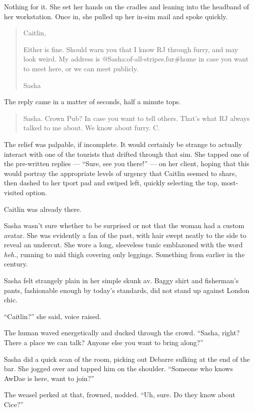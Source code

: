 Nothing for it. She set her hands on the cradles and leaning into the headband of her workstation. Once in, she pulled up her in-sim mail and spoke quickly.

\begin{quote}
Caitlin,

Either is fine. Should warn you that I know RJ through furry, and may look weird. My address is @Sasha:of-all-stripes.fur\#home in case you want to meet here, or we can meet publicly.

Sasha
\end{quote}

The reply came in a matter of seconds, half a minute tops.

\begin{quote}
Sasha. Crown Pub? In case you want to tell others. That's what RJ always talked to me about. We know about furry. C.
\end{quote}

The relief was palpable, if incomplete. It would certainly be strange to actually interact with one of the tourists that drifted through that sim. She tapped one of the pre-written replies — ``Sure, see you there!'' — on her client, hoping that this would portray the appropriate levels of urgency that Caitlin seemed to share, then dashed to her tport pad and swiped left, quickly selecting the top, most-visited option.

Caitlin was already there.

Sasha wasn't sure whether to be surprised or not that the woman had a custom avatar. She was evidently a fan of the past, with hair swept neatly to the side to reveal an undercut. She wore a long, sleeveless tunic emblazoned with the word \emph{heh.}, running to mid thigh covering only leggings. Something from earlier in the century.

Sasha felt strangely plain in her simple skunk av. Baggy shirt and fisherman's pants, fashionable enough by today's standards, did not stand up against London chic.

``Caitlin?'' she said, voice raised.

The human waved energetically and ducked through the crowd. ``Sasha, right? There a place we can talk? Anyone else you want to bring along?''

Sasha did a quick scan of the room, picking out Debarre sulking at the end of the bar. She jogged over and tapped him on the shoulder. ``Someone who knows AwDae is here, want to join?''

The weasel perked at that, frowned, nodded. ``Uh, sure. Do they know about Cice?''

